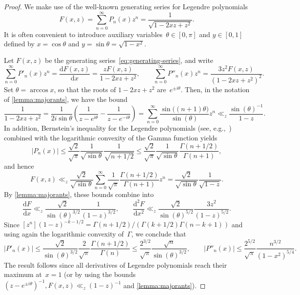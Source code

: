 \documentclass[nohypdvips,review]{siamart0216}
\begin{document}
\begin{proof}
We make use of the well-known generating series for Legendre polynomials
\begin{equation} \label{eq:generating-series}
  F(x, z)
  = \sum_{n=0}^{\infty} P_n(x) z^n
  = \frac{1}{\sqrt{1 - 2 x z + z^2}}.
\end{equation}
It is often convenient to introduce auxiliary
variables~$\theta \in [0, \pi]$ and $y \in [0, 1]$ defined by
$x = \cos \theta$ and $y = \sin \theta = \sqrt{1 - x^2}$.

Let $F(x, z)$ be the generating series~\cref{eq:generating-series}, and write
\[
  \sum_{n=0}^{\infty} P'_n(x) z^n
  = \frac{\mathrm d F(x, z)}{\mathrm d x}
  = \frac{z F(x, z)}{1 - 2 x z + z^2},
  \qquad
  \sum_{n=0}^{\infty} P''_n(x) z^n
  = \frac{3 z^2 F(x, z)}{(1 - 2 x z + z^2)^2}.
\]
Set $\theta = \arccos x$, so that the roots of $1 - 2 x z + z^2$
are $e^{\pm i \theta}$.
Then, in the notation of \cref{lemma:majorants}, we have the bound
\[ \frac{1}{1 - 2 x z + z^2}
   = \frac{1}{2 i \sin \theta} \left( \frac{1}{z - e^{i \theta}} -
                                      \frac{1}{z - e^{-i \theta}} \right)
   = \sum_{n=0}^{\infty} \frac{\sin\bigl((n+1) \theta\bigr)}{\sin(\theta)} z^n
   \ll_z \frac{\sin(\theta)^{-1}}{1 - z}. \]
In addition, Bernstein's inequality for the Legendre polynomials
(see, e.g.,~\cite{ChowGatteschiWong1994})
combined with the logarithmic convexity of the Gamma function yields
\[ |P_n(x)| \leq \frac{\sqrt{2}}{\sqrt{\pi}} \frac{1}{\sqrt{\sin \theta}}
                 \frac{1}{\sqrt{n+1/2}}
            \leq \frac{\sqrt 2}{\sqrt{\pi}} \frac{1}{\sqrt{\sin \theta}}
                 \frac{\Gamma(n+1/2)}{\Gamma(n+1)},
\]
and hence
\[ F(x, z) \ll_z \frac{\sqrt{2}}{\sqrt{\sin \theta}}
               \sum_{n=0}^{\infty} \frac{1}{\sqrt{\pi}}
                                  \frac{\Gamma(n+1/2)}{\Gamma(n+1)} z^n
            = \frac{\sqrt{2}}{\sqrt{\sin \theta}}
              \frac{1}{\sqrt{1-z}}. \]
By \cref{lemma:majorants}, these bounds combine into
\[ \frac{\mathrm d F}{\mathrm d x}
   \ll_z \frac{\sqrt{2}}{\sin(\theta)^{3/2}} \frac{1}{(1-z)^{3/2}},
   \qquad
   \frac{\mathrm d^2 F}{\mathrm d x^2}
   \ll_z \frac{\sqrt{2}}{\sin(\theta)^{5/2}} \frac{3 z^2}{(1-z)^{5/2}}. \]
Since
$[z^n] (1 - z)^{- k - 1/2} = \Gamma(n + 1/2)/(\Gamma(k+1/2) \Gamma(n - k + 1))$
and using again the logarithmic convexity of~$\Gamma$, we conclude
that
\[ |P'_n(x)| \leq \frac{\sqrt{2}}{\sin(\theta)^{3/2}}
                  \frac{2}{\sqrt{\pi}} \frac{\Gamma(n+1/2)}{\Gamma(n)}
             \leq \frac{2^{3/2}}{\sqrt{\pi}} \frac{\sqrt n}{\sin(\theta)^{3/2}},
   \qquad
   |P''_n(x)| \leq \frac{2^{5/2}}{\sqrt{\pi}} \frac{n^{3/2}}{(1-x^2)^{5/4}}.
\]
The result follows since all derivatives of Legendre polynomials reach
their maximum at~$x=1$ (or by using the bounds
$(z\!-\!e^{\pm i \theta})^{-1}, F(x, z) \ll_z (1\!-\!z)^{-1}$
and \cref{lemma:majorants}).
\end{proof}
\end{document}
